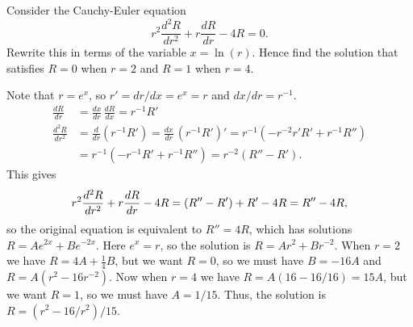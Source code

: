 \documentclass[a4paper]{amsart}
\begin{document}
\begin{exercise}\label{ex-transform-c}
 Consider the Cauchy-Euler equation
 \[ r^2 \frac{d^2R}{dr^2} + r \frac{dR}{dr} - 4R = 0. \]
 Rewrite this in terms of the variable $x=\ln(r)$.  Hence find the solution
 that satisfies $R=0$ when $r=2$ and $R=1$ when $r=4$.
\end{exercise}
\begin{solution}
 Note that $r=e^x$, so $r'=dr/dx=e^x=r$ and $dx/dr=r^{-1}$.
 \begin{align*}
  \frac{dR}{dr} &= \frac{dx}{dr}\,\frac{dR}{dx} = r^{-1}R' \\
  \frac{d^2R}{dr^2} &= \frac{d}{dr}(r^{-1}R') 
     = \frac{dx}{dr}\,(r^{-1}R')' 
     = r^{-1}(-r^{-2}r'R'+r^{-1}R'') \\
    &= r^{-1}(-r^{-1}R'+r^{-1}R'')
     = r^{-2}(R''-R').
 \end{align*}
 This gives
 \[ r^2 \frac{d^2R}{dr^2} + r \frac{dR}{dr} - 4R \\
     = (R''-R') + R' - 4R = R''-4R,
 \]
 so the original equation is equivalent to $R''=4R$, which has
 solutions $R=Ae^{2x}+Be^{-2x}$.  Here $e^x=r$, so the solution is
 $R=Ar^2+Br^{-2}$.  When $r=2$ we have $R=4A+\tfrac{1}{4}B$, but we
 want $R=0$, so we must have $B=-16A$ and $R=A(r^2-16r^{-2})$.  Now
 when $r=4$ we have $R=A(16-16/16)=15A$, but we want $R=1$, so we must
 have $A=1/15$.  Thus, the solution is $R=(r^2-16/r^2)/15$.
\end{solution}
\end{document}
